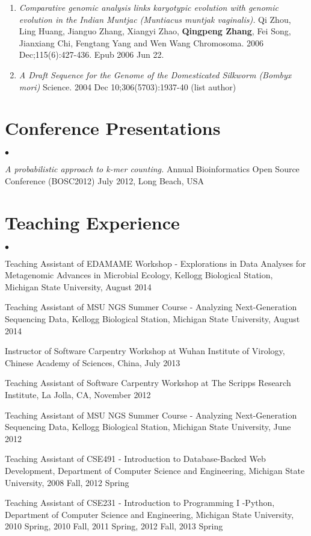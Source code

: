 \documentclass[margin,line]{res}
\newenvironment{list2}{
  \begin{list}{$\bullet$}{%
      \setlength{\itemsep}{0in}
      \setlength{\parsep}{0in} \setlength{\parskip}{0in}
      \setlength{\topsep}{0in} \setlength{\partopsep}{0in} 
      \setlength{\leftmargin}{0.2in}}}{\end{list}}
\begin{document}
\begin{resume}
\begin{enumerate}
\item {\em Comparative genomic analysis links karyotypic evolution with genomic 
evolution in the Indian Muntjac (Muntiacus muntjak vaginalis).} Qi Zhou, 
Ling Huang, Jianguo Zhang, Xiangyi Zhao, {\bf Qingpeng Zhang}, Fei Song, 
Jianxiang Chi, Fengtang Yang and Wen Wang Chromosoma. 
2006 Dec;115(6):427-436. Epub 2006 Jun 22.

\item {\em A Draft Sequence for the Genome of the Domesticated Silkworm (Bombyx mori)
} Science. 2004 Dec 10;306(5703):1937-40 (list author)

\end{enumerate}

\section{\sc Conference Presentations}
\begin{list2}
\item {\em A probabilistic approach to k-mer counting.} Annual Bioinformatics Open 
Source Conference (BOSC2012) July 2012, Long Beach, USA
\end{list2}


\section{\sc Teaching Experience}

\begin{list2}

\item Teaching Assistant of EDAMAME Workshop - Explorations in Data Analyses for Metagenomic Advances in Microbial Ecology, Kellogg Biological Station, Michigan State University, August 2014
\item Teaching Assistant of MSU NGS Summer Course - Analyzing Next-Generation Sequencing Data, Kellogg Biological Station, Michigan State University, August 2014
\item Instructor of Software Carpentry Workshop at Wuhan Institute of Virology, Chinese Academy of Sciences, China, July 2013
\item Teaching Assistant of Software Carpentry Workshop at The Scripps Research Institute, La Jolla, CA, November 2012
\item Teaching Assistant of MSU NGS Summer Course - Analyzing Next-Generation Sequencing Data, Kellogg Biological Station, Michigan State University, June 2012
\item Teaching Assistant of CSE491 - Introduction to Database-Backed Web Development, Department of Computer Science and Engineering, Michigan State University, 2008 Fall, 2012 Spring
\item Teaching Assistant of CSE231 - Introduction to Programming I -Python, Department of Computer Science and Engineering, Michigan State University, 2010 Spring, 2010 Fall, 2011 Spring, 2012 Fall, 2013 Spring


\end{list2}
\end{resume}
\end{document}
